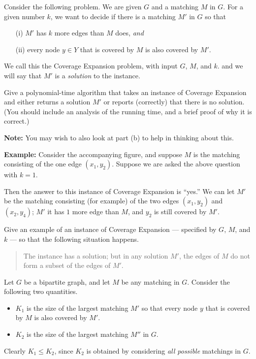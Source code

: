 \documentclass[12pt]{article}
\begin{document}
\begin{enumerate}
Consider the following problem.
We are given $G$ and a matching $M$ in $G$.
For a given number $k$, we want to decide if there
is a matching $M'$ in $G$ so that
\begin{itemize}
\item[(i)] $M'$ has $k$ more edges than $M$ does, {\em and}
\item[(ii)] every node $y \in Y$ that is covered
by $M$ is also covered by $M'$.
\end{itemize}
We call this the {\sc Coverage Expansion}
problem, with input $G$, $M$, and $k$.
and we will say that $M'$ is a {\em solution} to the instance.

Give a polynomial-time algorithm that takes an instance
of {\sc Coverage Expansion} and either returns a solution $M'$
or reports (correctly) that there is no solution.
(You should include an analysis of the running time,
and a brief proof of why it is correct.)

{\bf Note:} You may wish to also look at part (b) 
to help in thinking about this.

\medskip
{\bf Example:} Consider the accompanying figure,
and suppose $M$ is the matching consisting of the
one edge $(x_1,y_2)$.
Suppose we are asked the above question with $k = 1$.

Then the answer to this instance
of {\sc Coverage Expansion} is ``yes.''
We can let $M'$ be the matching consisting (for example)
of the two edges $(x_1,y_2)$ and $(x_2,y_4)$;
$M'$ it has $1$ more edge than $M$, and
$y_2$ is still covered by $M'$.

Give an example of an instance of
{\sc Coverage Expansion} --- specified by $G$, $M$, and $k$ ---
so that the following situation happens.
\begin{quote}
The instance has a solution; but in any solution $M'$,
the edges of $M$ do not form a subset of the edges of $M'$.
\end{quote}

Let $G$ be a bipartite graph, and let $M$ be any matching in $G$.
Consider the following two quantities.
\begin{itemize}
\item $K_1$ is the size of the largest matching $M'$
so that every node $y$ that is covered by $M$ is also covered by $M'$.
\item $K_2$ is the size of the largest matching $M''$ in $G$.
\end{itemize}
Clearly $K_1 \leq K_2$, since $K_2$ is obtained by considering
{\em all possible} matchings in $G$.


\end{enumerate}
\end{document}
